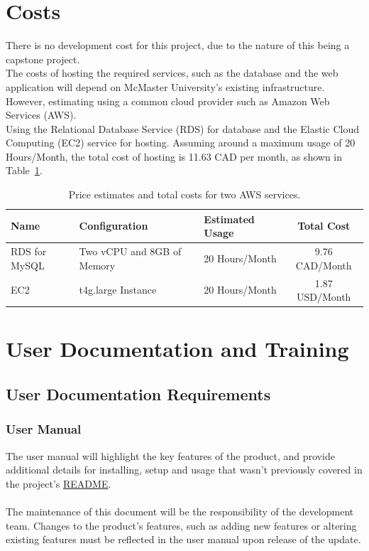 \documentclass[12pt]{article}
\begin{document}
\section{Costs}
There is no development cost for this project, due to the nature of this being a capstone project.
\\
The costs of hosting the required services, such as the database and the web application will depend on McMaster University's existing infrastructure.
\\
However, estimating using a common cloud provider such as Amazon Web Services (AWS). \\
Using the Relational Database Service (RDS) for database and the Elastic Cloud Computing (EC2) service for hosting.
Assuming around a maximum usage of 20 Hours/Month, the total cost of hosting is 11.63 CAD per month, as shown in Table~\ref{tab:price_table}.
\begin{table}[h!]
\centering
\begin{tabularx}{\textwidth}{@{} X X X c @{}}
\toprule
\textbf{Name} & \textbf{Configuration} & \textbf{Estimated Usage} & \textbf{Total Cost} \\
\midrule
RDS for MySQL & Two vCPU and 8GB of Memory & 20 Hours/Month & 9.76 CAD/Month \\
EC2 & t4g.large Instance & 20 Hours/Month & 1.87 USD/Month \\
\bottomrule
\end{tabularx}
\caption{Price estimates and total costs for two AWS services.}
\label{tab:price_table}
\end{table}

\section{User Documentation and Training}
\subsection{User Documentation Requirements}
\subsubsection{User Manual}
The user manual will highlight the key features of the product, and provide additional details for installing, setup and usage that wasn't previously covered in the project's \href{https://github.com/thaafei/DomainX/blob/main/README.md}{README}. \\
\\The maintenance of this document will be the responsibility of the development team. Changes to the product's features, such as adding new features or altering existing features must be reflected in the user manual upon release of the update.
\end{document}

